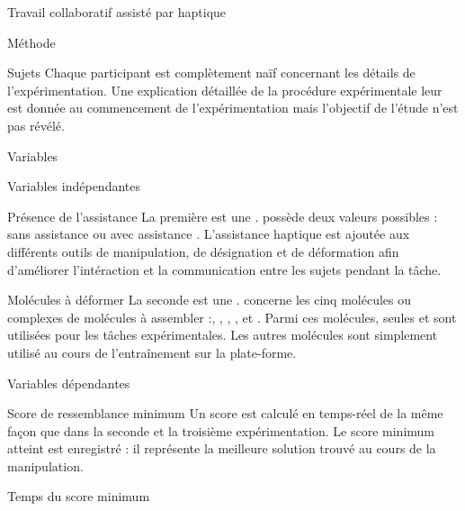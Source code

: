 \documentclass[myfrancais]{mythesis}
\begin{document}
\begin{mychapter}{Travail collaboratif assisté par haptique}
\begin{mysection}{Méthode}
\begin{mysubsection}{Sujets}
				Chaque participant est complètement naïf concernant les détails de l'expérimentation.
				Une explication détaillée de la procédure expérimentale leur est donnée au commencement de l'expérimentation mais l'objectif de l'étude n'est pas révélé.
			\end{mysubsection}
			\begin{mysubsection}{Variables}
				\begin{mysubsubsection}{Variables indépendantes}
					\begin{myparagraph}{ Présence de l'assistance}
						La première  est une .
						 possède deux valeurs possibles : \og sans assistance \fg ou \og avec assistance \fg.
						L'assistance haptique est ajoutée aux différents outils de manipulation, de désignation et de déformation afin d'améliorer l'intéraction et la communication entre les sujets pendant la tâche.
					\end{myparagraph}
					\begin{myparagraph}{ Molécules à déformer}
						La seconde  est une \myglos{glo-VariableIntraSujets}.
						 concerne les cinq molécules ou complexes de molécules à assembler :, \og \myTRPCAGE \fg, \og \myPrion \fg, \og \myUbiquitin \fg, \og \myTRPZIPPER \fg et \og \myNusENusG \fg.
						Parmi ces molécules, seules \myUbiquitin et \myNusENusG sont utilisées pour les tâches expérimentales.
						Les autres molécules sont simplement utilisé au cours de l'entraînement sur la plate-forme.
					\end{myparagraph}
				\end{mysubsubsection}
				\begin{mysubsubsection}{Variables dépendantes}
					\begin{myparagraph}{ Score de ressemblance minimum}
						Un score  est calculé en temps-réel de la même façon que dans la seconde et la troisième expérimentation.
						Le score minimum atteint est enregistré : il représente la meilleure solution trouvé au cours de la manipulation.
					\end{myparagraph}
					\begin{myparagraph}{ Temps du score \myacronl{acr-RMSD} minimum}

\end{myparagraph}
\end{mysubsubsection}
\end{mysubsection}
\end{mysection}
\end{mychapter}
\end{document}

